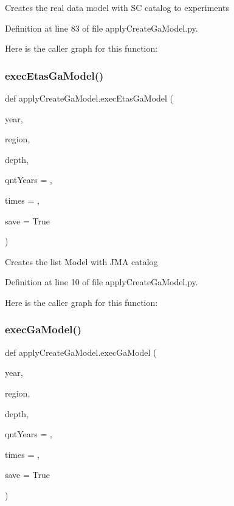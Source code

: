 \begin{DoxyVerb}Creates the real data model with SC catalog to experiments
\end{DoxyVerb}
 

Definition at line 83 of file apply\+Create\+Ga\+Model.\+py.

Here is the caller graph for this function\+:
\mbox{\label{namespaceapply_create_ga_model_a2dd980b3cf61508273c18e2d96034257}} 
\subsubsection{\texorpdfstring{exec\+Etas\+Ga\+Model()}{execEtasGaModel()}}
{\footnotesize\ttfamily def apply\+Create\+Ga\+Model.\+exec\+Etas\+Ga\+Model (\begin{DoxyParamCaption}\item[{}]{year,  }\item[{}]{region,  }\item[{}]{depth,  }\item[{}]{qnt\+Years = {},  }\item[{}]{times = {},  }\item[{}]{save = {\ttfamily True} }\end{DoxyParamCaption})}

\begin{DoxyVerb}Creates the list Model with JMA catalog
\end{DoxyVerb}
 

Definition at line 10 of file apply\+Create\+Ga\+Model.\+py.

Here is the caller graph for this function\+:
\mbox{\label{namespaceapply_create_ga_model_a8d37832259617b21032ee52669c4e854}} 
\subsubsection{\texorpdfstring{exec\+Ga\+Model()}{execGaModel()}}
{\footnotesize\ttfamily def apply\+Create\+Ga\+Model.\+exec\+Ga\+Model (\begin{DoxyParamCaption}\item[{}]{year,  }\item[{}]{region,  }\item[{}]{depth,  }\item[{}]{qnt\+Years = {},  }\item[{}]{times = {},  }\item[{}]{save = {\ttfamily True} }\end{DoxyParamCaption})}

